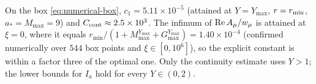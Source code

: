 On the box \eqref{eq:numerical-box}, $c_1=5.11\times10^{-5}$ (attained at $Y=Y_{\max}$, $r=r_{\min}$,
$a_\ast=M_{\max}=9$) and $C_{\rm cont}\approx2.5\times10^3$.  The infimum of $\operatorname{Re} A_\mu/w_\mu$ is
attained at $\xi=0$, where it equals $r_{\min}/(1+M_{\max}^{Y_{\max}}+G_{\max}^{Y_{\max}})
=1.40\times10^{-4}$ (confirmed numerically over $544$ box points and $\xi\in[0,10^6]$), so the
explicit constant is within a factor three of the optimal one.  Only the continuity estimate uses
$Y>1$; the lower bounds for $I_a$ hold for every $Y\in(0,2)$.
